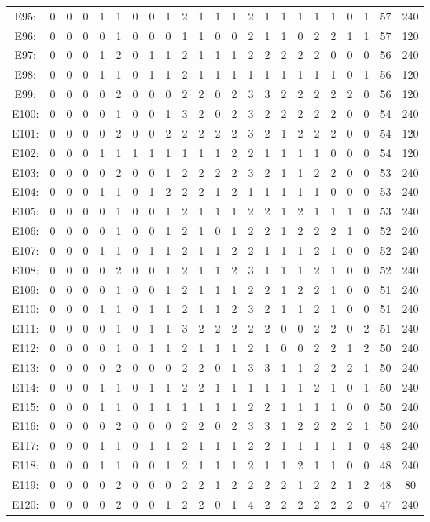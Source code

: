 \documentclass[12pt]{article}
\begin{document}
\begin{center}
\begin{tabular}{ccccccccccccccccccccc|c|c}
E95:&0&0&0&1&1&0&0&1&2&1&1&1&2&1&1&1&1&1&0&1&57&240\\
E96:&0&0&0&0&1&0&0&0&1&1&0&0&2&1&1&0&2&2&1&1&57&120\\
E97:&0&0&0&1&2&0&1&1&2&1&1&1&2&2&2&2&2&0&0&0&56&240\\
E98:&0&0&0&1&1&0&1&1&2&1&1&1&1&1&1&1&1&1&0&1&56&120\\
E99:&0&0&0&0&2&0&0&0&2&2&0&2&3&3&2&2&2&2&2&0&56&120\\
E100:&0&0&0&0&1&0&0&1&3&2&0&2&3&2&2&2&2&2&0&0&54&240\\
E101:&0&0&0&0&2&0&0&2&2&2&2&2&3&2&1&2&2&2&0&0&54&120\\
E102:&0&0&0&1&1&1&1&1&1&1&1&2&2&1&1&1&1&0&0&0&54&120\\
E103:&0&0&0&0&2&0&0&1&2&2&2&2&3&2&1&1&2&2&0&0&53&240\\
E104:&0&0&0&1&1&0&1&2&2&2&1&2&1&1&1&1&1&0&0&0&53&240\\
E105:&0&0&0&0&1&0&0&1&2&1&1&1&2&2&1&2&1&1&1&0&53&240\\
E106:&0&0&0&0&1&0&0&1&2&1&0&1&2&2&1&2&2&2&1&0&52&240\\
E107:&0&0&0&1&1&0&1&1&2&1&1&2&2&1&1&1&2&1&0&0&52&240\\
E108:&0&0&0&0&2&0&0&1&2&1&1&2&3&1&1&1&2&1&0&0&52&240\\
E109:&0&0&0&0&1&0&0&1&2&1&1&1&2&2&1&2&2&1&0&0&51&240\\
E110:&0&0&0&1&1&0&1&1&2&1&1&2&3&2&1&1&2&1&0&0&51&240\\
E111:&0&0&0&0&1&0&1&1&3&2&2&2&2&2&0&0&2&2&0&2&51&240\\
E112:&0&0&0&0&1&0&1&1&2&1&1&1&2&1&0&0&2&2&1&2&50&240\\
E113:&0&0&0&0&2&0&0&0&2&2&0&1&3&3&1&1&2&2&2&1&50&240\\
E114:&0&0&0&1&1&0&1&1&2&2&1&1&1&1&1&1&2&1&0&1&50&240\\
E115:&0&0&0&1&1&0&1&1&1&1&1&1&2&2&1&1&1&1&0&0&50&240\\
E116:&0&0&0&0&2&0&0&0&2&2&0&2&3&3&1&2&2&2&2&1&50&240\\
E117:&0&0&0&1&1&0&1&1&2&1&1&1&2&2&1&1&1&1&1&0&48&240\\
E118:&0&0&0&1&1&0&0&1&2&1&1&1&2&1&1&2&1&1&0&0&48&240\\
E119:&0&0&0&0&2&0&0&0&2&2&1&2&2&2&2&1&2&2&1&2&48&80\\
E120:&0&0&0&0&2&0&0&1&2&2&0&1&4&2&2&2&2&2&2&0&47&240\\
\end{tabular}
\end{center}
\end{document}
